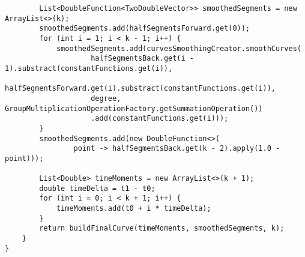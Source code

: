 \begin{verbatim}
        List<DoubleFunction<TwoDoubleVector>> smoothedSegments = new ArrayList<>(k);
        smoothedSegments.add(halfSegmentsForward.get(0));
        for (int i = 1; i < k - 1; i++) {
            smoothedSegments.add(curvesSmoothingCreator.smoothCurves(
                    halfSegmentsBack.get(i - 1).substract(constantFunctions.get(i)),
                    halfSegmentsForward.get(i).substract(constantFunctions.get(i)),
                    degree, GroupMultiplicationOperationFactory.getSummationOperation())
                    .add(constantFunctions.get(i)));
        }
        smoothedSegments.add(new DoubleFunction<>(
                point -> halfSegmentsBack.get(k - 2).apply(1.0 - point)));

        List<Double> timeMoments = new ArrayList<>(k + 1);
        double timeDelta = t1 - t0;
        for (int i = 0; i < k + 1; i++) {
            timeMoments.add(t0 + i * timeDelta);
        }
        return buildFinalCurve(timeMoments, smoothedSegments, k);
    }
}
\end{verbatim}

